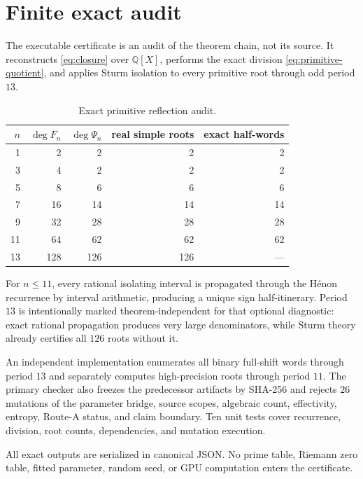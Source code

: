\section{Finite exact audit}\label{sec:finite}

The executable certificate is an audit of the theorem chain, not its source.
It reconstructs \eqref{eq:closure} over $\mathbb Q[X]$, performs the exact
division \eqref{eq:primitive-quotient}, and applies Sturm isolation to every
primitive root through odd period $13$.

\begin{table}[ht]
\centering
\caption{Exact primitive reflection audit.}
\label{tab:finite}
\begin{tabular}{rrrrr}
\toprule
$n$ & $\deg F_n$ & $\deg\Psi_n$ & real simple roots & exact half-words\\
\midrule
1  & 2   & 2   & 2   & 2\\
3  & 4   & 2   & 2   & 2\\
5  & 8   & 6   & 6   & 6\\
7  & 16  & 14  & 14  & 14\\
9  & 32  & 28  & 28  & 28\\
11 & 64  & 62  & 62  & 62\\
13 & 128 & 126 & 126 & ---\\
\bottomrule
\end{tabular}
\end{table}

For $n\le11$, every rational isolating interval is propagated through the
H\'enon recurrence by interval arithmetic, producing a unique sign
half-itinerary.  Period $13$ is intentionally marked theorem-independent for
that optional diagnostic: exact rational propagation produces very large
denominators, while Sturm theory already certifies all $126$ roots without
it.

An independent implementation enumerates all binary full-shift words through
period $13$ and separately computes high-precision roots through period $11$.
The primary checker also freezes the predecessor artifacts by SHA-256 and
rejects $26$ mutations of the parameter bridge, source scopes, algebraic
count, effectivity, entropy, Route-A status, and claim boundary.  Ten unit
tests cover recurrence, division, root counts, dependencies, and mutation
execution.

All exact outputs are serialized in canonical JSON.  No prime table, Riemann
zero table, fitted parameter, random seed, or GPU computation enters the
certificate.
